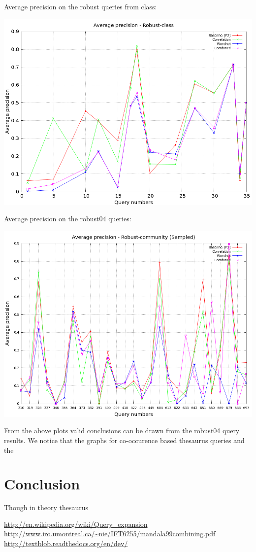 \documentclass[a4paper, 12pt, notitlepage]{report}
\begin{document}
Average precision on the robust queries from class:
\begin{center}
\includegraphics[scale = 0.4]{robust-class_avg}
\end{center}

Average precision on the robust04 queries:
\begin{center}
\includegraphics[scale = 0.4]{sampled-robust-comm_avg}
\end{center}

From the above plots valid conclusions can be drawn from the robust04 query results. We notice that the graphs for co-occurence based thesaurus queries and the 


\chapter{Conclusion}

Though in theory thesaurus 

\begin{thebibliography}{1}
 \url{http://en.wikipedia.org/wiki/Query_expansion}
 \url{http://www.iro.umontreal.ca/~nie/IFT6255/mandala99combining.pdf}
 \url{http://textblob.readthedocs.org/en/dev/}
\end{thebibliography}
\end{document}

